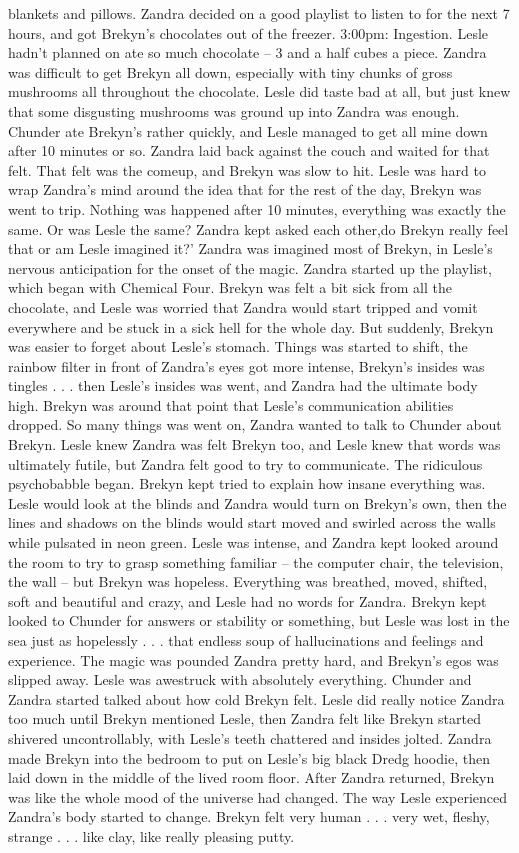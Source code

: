 \documentclass[12pt]{book}
\begin{document}
blankets and pillows. Zandra decided on a good playlist to listen to for the next 7 hours, and got Brekyn's chocolates out of the freezer. 3:00pm: Ingestion. Lesle hadn't planned on ate so much chocolate -- 3 and a half cubes a piece. Zandra was difficult to get Brekyn all down, especially with tiny chunks of gross mushrooms all throughout the chocolate. Lesle did taste bad at all, but just knew that some disgusting mushrooms was ground up into Zandra was enough. Chunder ate Brekyn's rather quickly, and Lesle managed to get all mine down after 10 minutes or so. Zandra laid back against the couch and waited for that felt. That felt was the comeup, and Brekyn was slow to hit. Lesle was hard to wrap Zandra's mind around the idea that for the rest of the day, Brekyn was went to trip. Nothing was happened after 10 minutes, everything was exactly the same. Or was Lesle the same? Zandra kept asked each other,do Brekyn really feel that or am Lesle imagined it?' Zandra was imagined most of Brekyn, in Lesle's nervous anticipation for the onset of the magic. Zandra started up the playlist, which began with Chemical Four. Brekyn was felt a bit sick from all the chocolate, and Lesle was worried that Zandra would start tripped and vomit everywhere and be stuck in a sick hell for the whole day. But suddenly, Brekyn was easier to forget about Lesle's stomach. Things was started to shift, the rainbow filter in front of Zandra's eyes got more intense, Brekyn's insides was tingles . . .  then Lesle's insides was went, and Zandra had the ultimate body high. Brekyn was around that point that Lesle's communication abilities dropped. So many things was went on, Zandra wanted to talk to Chunder about Brekyn. Lesle knew Zandra was felt Brekyn too, and Lesle knew that words was ultimately futile, but Zandra felt good to try to communicate. The ridiculous psychobabble began. Brekyn kept tried to explain how insane everything was. Lesle would look at the blinds and Zandra would turn on Brekyn's own, then the lines and shadows on the blinds would start moved and swirled across the walls while pulsated in neon green. Lesle was intense, and Zandra kept looked around the room to try to grasp something familiar -- the computer chair, the television, the wall -- but Brekyn was hopeless. Everything was breathed, moved, shifted, soft and beautiful and crazy, and Lesle had no words for Zandra. Brekyn kept looked to Chunder for answers or stability or something, but Lesle was lost in the sea just as hopelessly . . .  that endless soup of hallucinations and feelings and experience. The magic was pounded Zandra pretty hard, and Brekyn's egos was slipped away. Lesle was awestruck with absolutely everything. Chunder and Zandra started talked about how cold Brekyn felt. Lesle did really notice Zandra too much until Brekyn mentioned Lesle, then Zandra felt like Brekyn started shivered uncontrollably, with Lesle's teeth chattered and insides jolted. Zandra made Brekyn into the bedroom to put on Lesle's big black Dredg hoodie, then laid down in the middle of the lived room floor. After Zandra returned, Brekyn was like the whole mood of the universe had changed. The way Lesle experienced Zandra's body started to change. Brekyn felt very human . . .  very wet, fleshy, strange . . .  like clay, like really pleasing putty. 
\end{document}
